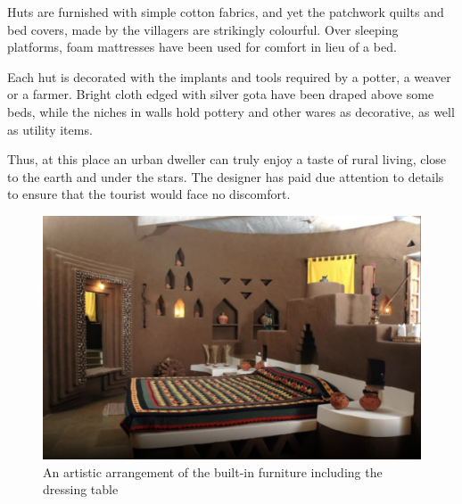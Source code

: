 \noindent Huts are furnished with simple cotton fabrics, and yet the patchwork quilts and bed covers, made by the villagers are strikingly colourful. Over sleeping platforms, foam mattresses have been used for comfort in lieu of a bed.

Each hut is decorated with the implants and tools required by a potter, a weaver or a farmer. Bright cloth edged with silver gota have been draped above some beds, while the niches in walls hold pottery and other wares as decorative, as well as utility items.

Thus, at this place an urban dweller can truly enjoy a taste of rural living, close to the earth and under the stars. The designer has paid due attention to details to ensure that the tourist would face no discomfort.

\begin{figure}[H]
  \centering
  \includegraphics[angle=0,width=1.0\textwidth]{img/dc-07}
  \caption{An artistic arrangement of the built-in furniture including the dressing table}
  \label{fig:dc-07} 
\end{figure}


